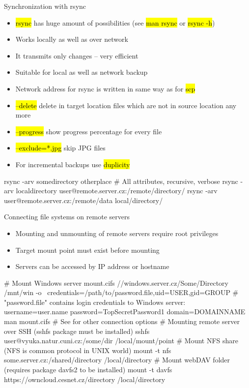 \documentclass[compress, ucs, xelatex, 11pt, xcolor=svgnames,
  hyperref={
    bookmarks=true,
    unicode=true,
    colorlinks=true,
    pdftitle={Linux, command line and MetaCentrum},
    plainpages=false,
    pdfauthor={Vojtech Zeisek},
    pdfsubject={Course about use of Linux command line, writing shell scripts and using MetaCentrum of CESNET},
    pdfcreator={XeLaTeX},
    pdfkeywords={Linux, GNU, BASH, shell, command line, MetaCentrum},
    linkcolor=Red,
    anchorcolor=Blue,
    citecolor=Purple,
    filecolor=DodgerBlue,
    menucolor=DarkOrchid,
    urlcolor=DeepSkyBlue,
    pdftex},
  url={hyphens, lowtilde} %
  ]{beamer}
\renewcommand{\texttt}[1]{\hl{\ttfamily #1}}
\begin{document}
\begin{frame}[fragile]{Synchronization with rsync}
  \begin{itemize}
    \item \texttt{rsync} has huge amount of possibilities (see \texttt{man rsync} or \texttt{rsync -h})
    \item Works locally as well as over network
    \item It transmits only changes -- very efficient
    \item Suitable for local as well as network backup
    \item Network address for rsync is written in same way as for \texttt{scp}
    \item \texttt{--delete} delete in target location files which are not in source location any more
    \item \texttt{--progress} show progress percentage for every file
    \item \texttt{--exclude=*.jpg} skip JPG files
    \item For incremental backups use \texttt{duplicity}
  \end{itemize}
  \begin{bashcode}
    rsync -arv somedirectory otherplace # All attributes, recursive, verbose
    rsync -arv localdirectory user@remote.server.cz:/remote/directory/
    rsync -arv user@remote.server.cz:/remote/data local/directory/
  \end{bashcode}
\end{frame}

\begin{frame}[fragile]{Connecting file systems on remote servers}
  \begin{itemize}
    \item Mounting and unmounting of remote servers require root privileges
    \item Target mount point must exist before mounting
    \item Servers can be accessed by IP address or hostname
  \end{itemize}
  \begin{bashcode}
    # Mount Windows server
    mount.cifs //windows.server.cz/Some/Directory /mnt/win -o \
      credentials=/path/to/password.file,uid=USER,gid=GROUP
    # "password.file" contains login credentials to Windows server:
    username=user.name
    password=TopSecretPassword1
    domain=DOMAINNAME
    man mount.cifs # See for other connection options
    # Mounting remote server over SSH (sshfs package must be installed)
    sshfs user@vyuka.natur.cuni.cz:/some/dir /local/mount/point
    # Mount NFS share (NFS is common protocol in UNIX world)
    mount -t nfs some.server.cz:/shared/directory /local/directory
    # Mount webDAV folder (requires package davfs2 to be installed)
    mount -t davfs https://owncloud.cesnet.cz/directory /local/directory
  \end{bashcode}
\end{frame}
\end{document}
